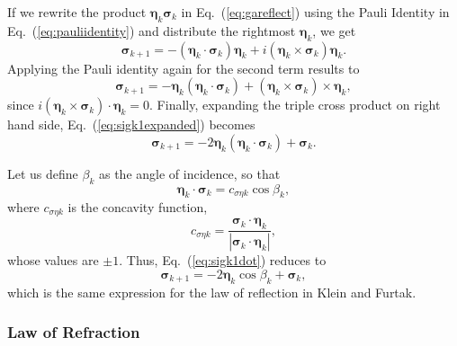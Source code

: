 \documentclass[a4paper,twocolumn,superscriptaddress]{revtex4-1}
\begin{document}
{If we rewrite the product $\bm \eta_k \bm \sigma_k$ in Eq.~(\ref{eq:gareflect}) using the Pauli Identity in Eq.~(\ref{eq:pauliidentity}) and distribute the rightmost $\bm \eta_k$, we get
\begin{equation} 
    \bm \sigma_{k+1} = 
    - (\bm \eta_k \cdot \bm \sigma_k) \bm \eta_k + i (\bm \eta_k \times \bm \sigma_k)\bm \eta_k .
\end{equation}
Applying the Pauli identity again for the second term results to
\begin{equation} 
\label{eq:sigk1expanded}
    \bm \sigma_{k+1} = 
    - \bm \eta_k (\bm \eta_k \cdot \bm \sigma_k) + (\bm \eta_k \times \bm \sigma_k) \times \bm \eta_k ,
\end{equation}
since $i (\bm \eta_k \times \bm \sigma_k) \cdot \bm \eta_k = 0$.
Finally, expanding the triple cross product on right hand side,
Eq.~(\ref{eq:sigk1expanded}) becomes
\begin{equation} 
\label{eq:sigk1dot}
    \bm \sigma_{k+1} = 
    - 2\bm \eta_k (\bm \eta_k \cdot \bm \sigma_k) + \bm \sigma_k .
\end{equation}

Let us define $\beta_k$ as the angle of incidence, so that
\begin{equation}
\bm \eta_k \cdot \bm \sigma_k = c_{\sigma \eta k} \cos \beta_k ,
\end{equation}
where $c_{\sigma \eta k}$ is the concavity function,
\begin{equation}
    \label{eq:concavityfnc}
    c_{\sigma \eta k} = 
    \frac{\bm \sigma_k \cdot \bm \eta_k}{|\bm \sigma_k \cdot \bm \eta_k|} ,
\end{equation}
whose values are $\pm 1$. Thus, Eq.~(\ref{eq:sigk1dot}) reduces to
\begin{equation} 
    \bm \sigma_{k+1} = 
    - 2\bm \eta_k \cos \beta_k + \bm \sigma_k ,
\end{equation}
which is the same expression for the law of reflection in Klein and Furtak. \cite{kleitak,sugonAJP}



\subsubsection{Law of Refraction} 
\label{sec:lawofrefraction}

}
\end{document}
